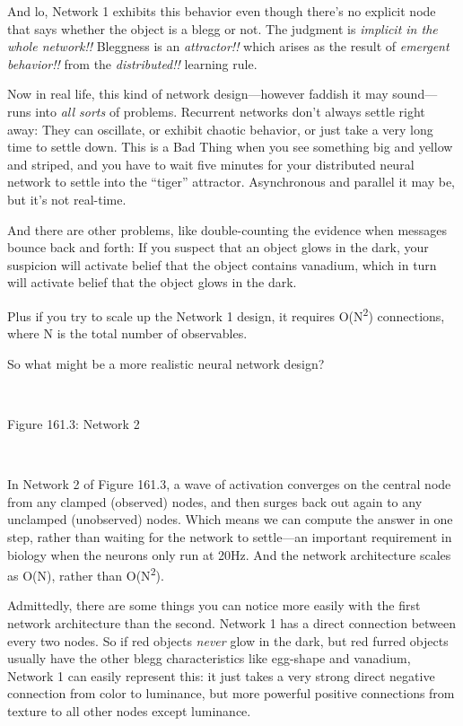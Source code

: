 {
 And lo, Network 1 exhibits this behavior even though
there's no explicit node that says whether the object
is a blegg or not. The judgment is \textit{implicit in the whole
network!!} Bleggness is an \textit{attractor!!} which arises as the
result of \textit{emergent behavior!!} from the \textit{distributed!!}
learning rule.}

{
 Now in real life, this kind of network design---however faddish it
may sound---runs into \textit{all sorts} of problems. Recurrent
networks don't always settle right away: They can
oscillate, or exhibit chaotic behavior, or just take a very long time
to settle down. This is a Bad Thing when you see something big and
yellow and striped, and you have to wait five minutes for your
distributed neural network to settle into the
``tiger'' attractor. Asynchronous
and parallel it may be, but it's not real-time.}

{
 And there are other problems, like double-counting the evidence
when messages bounce back and forth: If you suspect that an object
glows in the dark, your suspicion will activate belief that the object
contains vanadium, which in turn will activate belief that the object
glows in the dark.}

{
 Plus if you try to scale up the Network 1 design, it requires
O(N\textsuperscript{2}) connections, where N is the total number of
observables.}

{
 So what might be a more realistic neural network design?}

{
 ~}

{\centering
{}
 \newline
 Figure 161.3: Network 2
\par}


\bigskip

{
 ~}

{
 In Network 2 of Figure 161.3, a wave of activation converges on
the central node from any clamped (observed) nodes, and then surges
back out again to any unclamped (unobserved) nodes. Which means we can
compute the answer in one step, rather than waiting for the network to
settle---an important requirement in biology when the neurons only run
at 20Hz. And the network architecture scales as O(N), rather than
O(N\textsuperscript{2}).}

{
 Admittedly, there are some things you can notice more easily with
the first network architecture than the second. Network 1 has a direct
connection between every two nodes. So if red objects \textit{never}
glow in the dark, but red furred objects usually have the other blegg
characteristics like egg-shape and vanadium, Network 1 can easily
represent this: it just takes a very strong direct negative connection
from color to luminance, but more powerful positive connections from
texture to all other nodes except luminance.}

